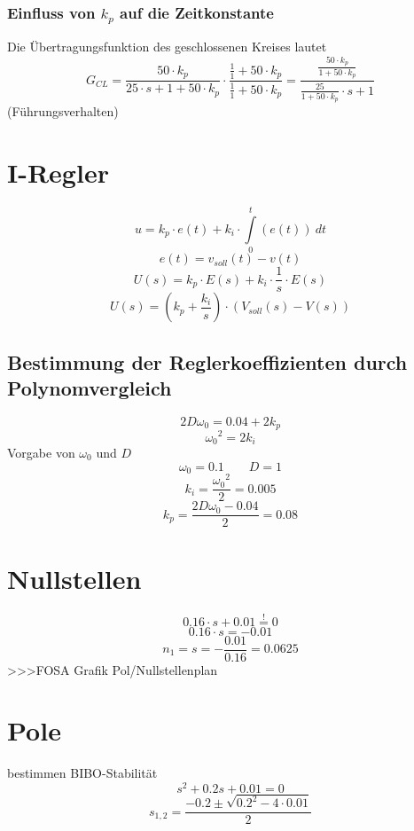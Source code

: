 \subsubsection{Einfluss von $k_p$ auf die Zeitkonstante}
Die Übertragungsfunktion des geschlossenen Kreises lautet
\[ G_{CL} = \frac{50 \cdot k_p}{25 \cdot s + 1 + 50 \cdot k_p} \cdot 
\frac{\frac{1}{1} + 50 \cdot k_p}{\frac{1}{1} + 50 \cdot k_p} 
= \frac{\frac{50 \cdot k_p}{1 + 50 \cdot k_p}}
{\frac{25}{1 + 50 \cdot k_p} \cdot s + 1} \]
(Führungsverhalten)

\section{I-Regler}
\[ u = k_p \cdot e(t) + k_i \cdot \int\limits_0^t (e(t)) ~ dt \]
\[ e(t) = v_{soll}(t) - v(t) \]
\[ U(s) = k_p \cdot E(s) + k_i \cdot \frac{1}{s} \cdot E(s) \]
\[ U(s) = \left( k_p + \frac{k_i}{s} \right) \cdot \left( V_{soll}(s) - V(s) \right) \]

\subsection{Bestimmung der Reglerkoeffizienten durch Polynomvergleich}
\[ 2 D \omega_0 = 0.04 + 2 k_p \]
\[ {\omega_0}^2 = 2 k_i \]
Vorgabe von $\omega_0$ und $D$
\[ \omega_0 = 0.1 \qquad D = 1 \]
\[ k_i = \frac{{\omega_0}^2}{2} = 0.005 \]
\[ k_p = \frac{2 D \omega_0 - 0.04}{2} = 0.08 \]

\section{Nullstellen}
\[ 0.16 \cdot s + 0.01 \stackrel{!}{=} 0 \]
\[ 0.16 \cdot s = -0.01 \]
\[ n_1 = s = -\frac{0.01}{0.16} = 0.0625 \]
>>>FOSA Grafik Pol/Nullstellenplan

\section{Pole}
bestimmen BIBO-Stabilität
\[ s^2 + 0.2 s + 0.01 = 0 \]
\[ s_{1,2} = \frac{-0.2 \pm \sqrt{0.2^2 - 4 \cdot 0.01}}{2} \]


